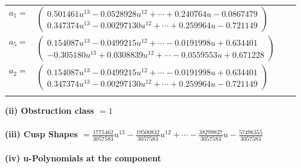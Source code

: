 \documentclass[1p]{elsarticle_modified}
\theoremstyle{definition}
\begin{document}
\begin{tabular}{m{7pt} m{180pt} m{7pt} m{180pt} }
\flushright $a_{1}=$&$\begin{pmatrix}0.501461 u^{13}-0.0528928 u^{12}+\cdots+0.240764 u-0.0867479\\0.347374 u^{13}-0.00297130 u^{12}+\cdots+0.259964 u-0.721149\end{pmatrix}$ \\
\flushright $a_{5}=$&$\begin{pmatrix}0.154087 u^{13}-0.0499215 u^{12}+\cdots-0.0191998 u+0.634401\\-0.305180 u^{13}+0.0308839 u^{12}+\cdots-0.0559553 u+0.671228\end{pmatrix}$ \\
\flushright $a_{2}=$&$\begin{pmatrix}0.154087 u^{13}-0.0499215 u^{12}+\cdots-0.0191998 u+0.634401\\0.347374 u^{13}-0.00297130 u^{12}+\cdots+0.259964 u-0.721149\end{pmatrix}$\\&\end{tabular}
\flushleft \textbf{(ii) Obstruction class $= 1$}\\~\\
\flushleft \textbf{(iii) Cusp Shapes $= \frac{1775462}{3057583} u^{13}-\frac{19500832}{3057583} u^{12}+\cdots-\frac{38299827}{3057583} u-\frac{57496355}{3057583}$}\\~\\
\newpage\renewcommand{\arraystretch}{1}
\flushleft \textbf{(iv) u-Polynomials at the component}\newline \\
\end{document}
